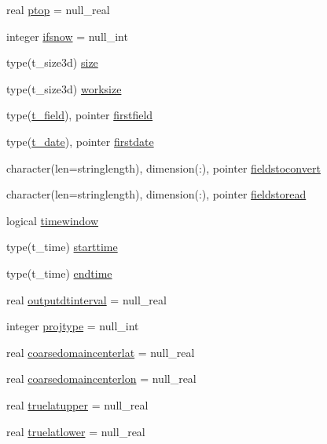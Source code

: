 \begin{DoxyCompactItemize}
\item 
real \mbox{\hyperlink{structmodulemm5format_1_1t__mm5format_a4356bcf3738930f8d9696c2a0443ac73}{ptop}} = null\+\_\+real
\item 
integer \mbox{\hyperlink{structmodulemm5format_1_1t__mm5format_ac9b845a29ba30be2e06f5a6a592db47e}{ifsnow}} = null\+\_\+int
\item 
type(t\+\_\+size3d) \mbox{\hyperlink{structmodulemm5format_1_1t__mm5format_a2fc497ecff8aac0da68a11e093141f3f}{size}}
\item 
type(t\+\_\+size3d) \mbox{\hyperlink{structmodulemm5format_1_1t__mm5format_a11ef41078064e579c46236e51b27f209}{worksize}}
\item 
type(\mbox{\hyperlink{structmodulemm5format_1_1t__field}{t\+\_\+field}}), pointer \mbox{\hyperlink{structmodulemm5format_1_1t__mm5format_a88a24a1211f89ff3c4cfab57e9f74824}{firstfield}}
\item 
type(\mbox{\hyperlink{structmodulemm5format_1_1t__date}{t\+\_\+date}}), pointer \mbox{\hyperlink{structmodulemm5format_1_1t__mm5format_a75cc64d2f94180a5acce98b0f6be55ce}{firstdate}}
\item 
character(len=stringlength), dimension(\+:), pointer \mbox{\hyperlink{structmodulemm5format_1_1t__mm5format_a4c6f7635270efb00e0e65533a9df81a7}{fieldstoconvert}}
\item 
character(len=stringlength), dimension(\+:), pointer \mbox{\hyperlink{structmodulemm5format_1_1t__mm5format_a6858f358c51598d0a982ec65cf275f5c}{fieldstoread}}
\item 
logical \mbox{\hyperlink{structmodulemm5format_1_1t__mm5format_aea05d27d1ac0ceea8852f98f0241d5b1}{timewindow}}
\item 
type(t\+\_\+time) \mbox{\hyperlink{structmodulemm5format_1_1t__mm5format_a1ac96579d5745aff050414e59335eff0}{starttime}}
\item 
type(t\+\_\+time) \mbox{\hyperlink{structmodulemm5format_1_1t__mm5format_a4493c13c892f5fcd669034a84571dbb4}{endtime}}
\item 
real \mbox{\hyperlink{structmodulemm5format_1_1t__mm5format_a1745a8eeed2fe56d8ef71c385628c609}{outputdtinterval}} = null\+\_\+real
\item 
integer \mbox{\hyperlink{structmodulemm5format_1_1t__mm5format_a5e79367b516b122334043d617f0b4e20}{projtype}} = null\+\_\+int
\item 
real \mbox{\hyperlink{structmodulemm5format_1_1t__mm5format_ae75681cce7f5412d2a17f2f33f5ba59e}{coarsedomaincenterlat}} = null\+\_\+real
\item 
real \mbox{\hyperlink{structmodulemm5format_1_1t__mm5format_ad2b80d218afcf3308bf5f4dcc548c136}{coarsedomaincenterlon}} = null\+\_\+real
\item 
real \mbox{\hyperlink{structmodulemm5format_1_1t__mm5format_a4d9292300a3e117a06ead7acdeb53704}{truelatupper}} = null\+\_\+real
\item 
real \mbox{\hyperlink{structmodulemm5format_1_1t__mm5format_ac9d6fc654bd0b74ce99653f123a2612c}{truelatlower}} = null\+\_\+real
\end{DoxyCompactItemize}


